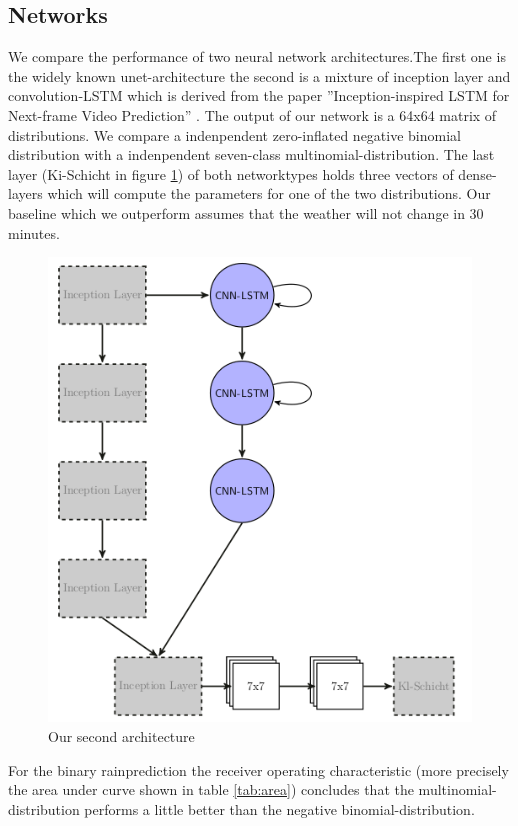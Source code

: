 \documentclass[oneside]{htwg-report}
\begin{document}
\subsection*{Networks}
    \begin{sloppypar}
    We compare the performance of two neural network architectures.The first one is the widely known unet-architecture \cite{DBLP:journals/corr/RonnebergerFB15} the second is a mixture of inception layer and convolution-LSTM which is derived from the paper ''Inception-inspired LSTM for Next-frame Video Prediction'' \cite{hosseini2019inceptioninspired}.
    The output of our network is a 64x64 matrix of distributions. We compare a indenpendent zero-inflated negative binomial distribution with a indenpendent seven-class multinomial-distribution. The last layer (Ki-Schicht in figure \ref{fig:lstm_conv}) of both networktypes holds three vectors of dense-layers which will compute the parameters for one of the two distributions. Our baseline which we outperform assumes that the weather will not change in 30 minutes.\\

    \begin{figure}[ht]
    \centering
    \includegraphics[width=0.8\linewidth,angle=0]{../abb/lstm_conv.png}
    \caption{\centering Our second architecture }
    \label{fig:lstm_conv}
    \end{figure}


For the binary rainprediction the receiver operating characteristic (more precisely the area under curve shown in table \ref{tab:area}) concludes that the multinomial-distribution performs a little better than the negative binomial-distribution.
\newpage
\begin{table}[h]


\end{table}
\end{sloppypar}
\end{document}
